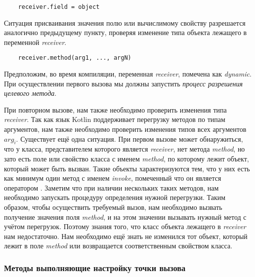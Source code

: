 \begin{verbatim}
    receiver.field = object
\end{verbatim}

Ситуация присваивания значения полю или вычислимому свойству разрешается аналогично предыдущему пункту, проверяя изменение типа объекта лежащего в переменной \textit{receiver}.

\begin{verbatim}
    receiver.method(arg1, ..., argN)
\end{verbatim}

Предположим, во время компиляции, переменная \textit{receiver}, помечена как \textit{dynamic}. При осуществлении первого
вызова мы должны запустить \textit{процесс разрешения целевого метода}.

При повторном вызове, нам также необходимо проверить изменения типа  \textit{receiver}. Так как язык Kotlin поддерживает перегрузку методов по типам аргументов, нам также необходимо проверить изменения типов всех аргументов $arg_i$. Существует ещё одна ситуация. При первом вызове может обнаружиться, что у класса, представителем которого является \textit{receiver}, нет метода \textit{method}, но зато есть поле или свойство класса с именем \textit{method}, по которому лежит объект, который может быть вызван. Такие объекты характеризуются тем, что у них есть как минимум один метод с именем \textit{invoke}, помеченный что он является оператором \cite{book:jemerov2017kotlininAction}. Заметим что при наличии нескольких таких методов, нам необходимо запускать процедуру определения нужной перегрузки. Таким образом, чтобы осуществить требуемый вызов, нам необходимо вызвать получение значения поля \textit{method}, и на этом значении вызывать нужный метод с учётом перегрузок. Поэтому знания того, что класс объекта лежащего в \textit{receiver} нам недостаточно. Нам необходимо ещё знать не изменился тот объект, который лежит в поле \textit{method} или возвращается соответственным свойством класса.




\subsubsection{Методы выполняющие настройку точки вызова}

